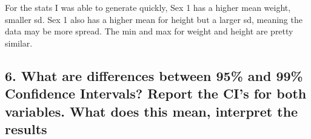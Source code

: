 \documentclass[]{article}
\newenvironment{Shaded}{\begin{snugshade}}{\end{snugshade}}
\newcommand{\DataTypeTok}[1]{\textcolor[rgb]{0.13,0.29,0.53}{#1}}
\newcommand{\DecValTok}[1]{\textcolor[rgb]{0.00,0.00,0.81}{#1}}
\newcommand{\FloatTok}[1]{\textcolor[rgb]{0.00,0.00,0.81}{#1}}
\newcommand{\KeywordTok}[1]{\textcolor[rgb]{0.13,0.29,0.53}{\textbf{#1}}}
\newcommand{\NormalTok}[1]{#1}
\newcommand{\OperatorTok}[1]{\textcolor[rgb]{0.81,0.36,0.00}{\textbf{#1}}}
\newcommand{\OtherTok}[1]{\textcolor[rgb]{0.56,0.35,0.01}{#1}}
\newcommand{\StringTok}[1]{\textcolor[rgb]{0.31,0.60,0.02}{#1}}
\begin{document}
For the stats I was able to generate quickly, Sex 1 has a higher mean
weight, smaller sd. Sex 1 also has a higher mean for height but a larger
sd, meaning the data may be more spread. The min and max for weight and
height are pretty similar.

\hypertarget{what-are-differences-between-95-and-99-confidence-intervals-report-the-cis-for-both-variables.-what-does-this-mean-interpret-the-results}{%
\subsection{6. What are differences between 95\% and 99\% Confidence
Intervals? Report the CI's for both variables. What does this mean,
interpret the
results}\label{what-are-differences-between-95-and-99-confidence-intervals-report-the-cis-for-both-variables.-what-does-this-mean-interpret-the-results}}

\begin{Shaded}
\end{Shaded}
\end{document}
